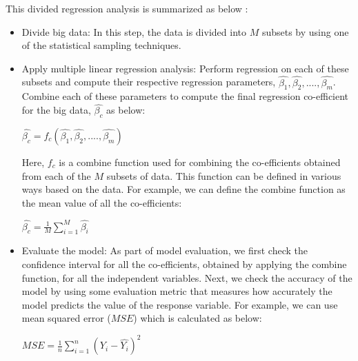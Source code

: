 \documentclass[sigconf]{acmart}
\begin{document}
This divided regression analysis is summarized as below \cite{div-reg}:

\begin{itemize}
	\item Divide big data: In this step, the data is divided into $M$ subsets by using one of the statistical sampling techniques.
	\item Apply multiple linear regression analysis: Perform regression on each of these subsets and compute their respective regression parameters, $\hat{\beta_1}, \hat{\beta_2}, ...., \hat{\beta_m}$. Combine each of these parameters to compute the final regression co-efficient for the big data, $\hat{\beta_c}$ as below:
	\begin{center}$\hat{\beta_c} = f_c(\hat{\beta_1}, \hat{\beta_2}, ...., \hat{\beta_m})$\end{center}
	Here, $f_c$ is a combine function used for combining the co-efficients obtained from each of the $M$ subsets of data. This function can be defined in various ways based on the data. For example, we can define the combine function as the mean value of all the co-efficients: 
	\begin{center} $\hat{\beta_c} = \frac{1}{M}\sum_{i=1}^M \hat{\beta_i}$ \end{center}
	\item Evaluate the model: As part of model evaluation, we first check the confidence interval for all the co-efficients, obtained by applying the combine function, for all the independent variables. Next, we check the accuracy of the model by using some evaluation metric that measures how accurately the model predicts the value of the response variable. For example, we can use mean squared error ($MSE$) which is calculated as below:
	\begin{center} $MSE = \frac{1}{n}\sum_{i=1}^n (Y_i - \hat{Y_i})^2$ \end{center}
\end{itemize} 
\end{document}
